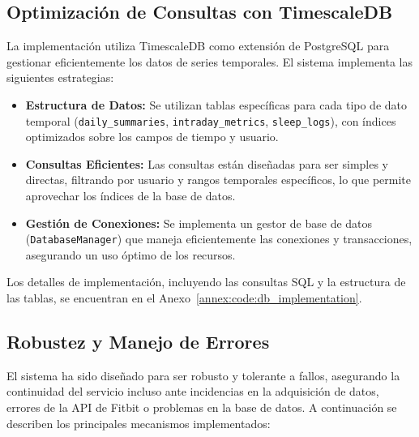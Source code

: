 \subsection{Optimización de Consultas con TimescaleDB}
\label{subsec:impl_timescaledb_optimization}

La implementación utiliza TimescaleDB como extensión de PostgreSQL para gestionar eficientemente los datos de series temporales. El sistema implementa las siguientes estrategias:

\begin{itemize}
    \item \textbf{Estructura de Datos:} Se utilizan tablas específicas para cada tipo de dato temporal (\texttt{daily\_summaries}, \texttt{intraday\_metrics}, \texttt{sleep\_logs}), con índices optimizados sobre los campos de tiempo y usuario.
    \item \textbf{Consultas Eficientes:} Las consultas están diseñadas para ser simples y directas, filtrando por usuario y rangos temporales específicos, lo que permite aprovechar los índices de la base de datos.
    \item \textbf{Gestión de Conexiones:} Se implementa un gestor de base de datos (\texttt{DatabaseManager}) que maneja eficientemente las conexiones y transacciones, asegurando un uso óptimo de los recursos.
\end{itemize}

Los detalles de implementación, incluyendo las consultas SQL y la estructura de las tablas, se encuentran en el Anexo~\ref{annex:code:db_implementation}. 

\subsection{Robustez y Manejo de Errores}
\label{subsec:robustez_errores}

El sistema ha sido diseñado para ser robusto y tolerante a fallos, asegurando la continuidad del servicio incluso ante incidencias en la adquisición de datos, errores de la API de Fitbit o problemas en la base de datos. A continuación se describen los principales mecanismos implementados:

